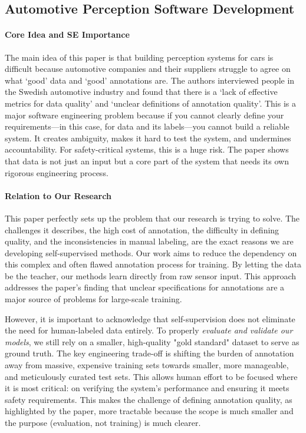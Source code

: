 \documentclass{article}
\begin{document}
\subsection{Automotive Perception Software Development~\cite{heyn2023automotive}}

\paragraph{Core Idea and SE Importance}
The main idea of this paper is that building perception systems for cars is difficult because automotive companies and their suppliers struggle to agree on what `good' data and `good' annotations are. 
The authors interviewed people in the Swedish automotive industry and found that there is a `lack of effective metrics for data quality' and `unclear definitions of annotation quality'. 
This is a major software engineering problem because if you cannot clearly define your requirements—in this case, for data and its labels—you cannot build a reliable system. 
It creates ambiguity, makes it hard to test the system, and undermines accountability. For safety-critical systems, this is a huge risk. 
The paper shows that data is not just an input but a core part of the system that needs its own rigorous engineering process.

\paragraph{Relation to Our Research}
This paper perfectly sets up the problem that our research is trying to solve. The challenges it describes, the high cost of annotation, the difficulty in defining quality, and the inconsistencies in manual labeling, are the exact reasons we are developing self-supervised methods. Our work aims to reduce the dependency on this complex and often flawed annotation process for training. By letting the data be the teacher, our methods learn directly from raw sensor input. This approach addresses the paper's finding that unclear specifications for annotations are a major source of problems for large-scale training.

However, it is important to acknowledge that self-supervision does not eliminate the need for human-labeled data entirely. To properly \textit{evaluate and validate our models}, we still rely on a smaller, high-quality "gold standard" dataset to serve as ground truth. The key engineering trade-off is shifting the burden of annotation away from massive, expensive training sets towards smaller, more manageable, and meticulously curated test sets. This allows human effort to be focused where it is most critical: on verifying the system's performance and ensuring it meets safety requirements. This makes the challenge of defining annotation quality, as highlighted by the paper, more tractable because the scope is much smaller and the purpose (evaluation, not training) is much clearer.
\end{document}
